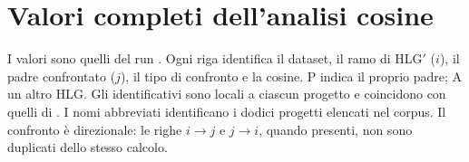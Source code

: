 \chapter{Valori completi dell'analisi cosine}
\label{app:all-cosine-values}
I valori sono quelli del run .
Ogni riga identifica il dataset, il ramo di HLG$'$ ($i$), il padre confrontato
($j$), il tipo di confronto e la cosine. P indica il proprio padre; A un altro
HLG. Gli identificativi sono locali a ciascun progetto e coincidono con quelli
di . I nomi abbreviati identificano i dodici progetti
elencati nel corpus. Il confronto è direzionale: le righe $i\rightarrow j$ e
$j\rightarrow i$, quando presenti, non sono duplicati dello stesso calcolo.

